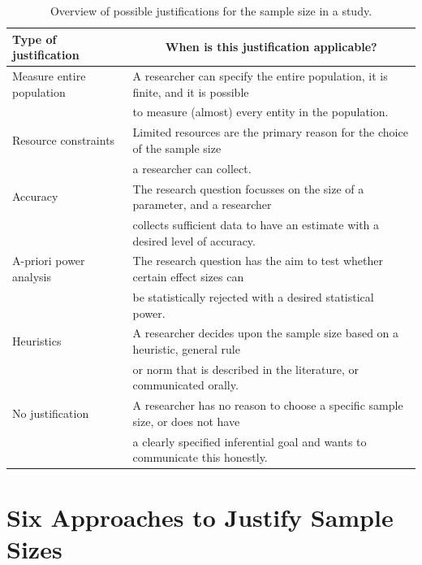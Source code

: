 \documentclass[
  english,
  ,jou, a4paper,floatsintext]{apa6}
\begin{document}
\begin{table}[tbp]

\begin{center}
\begin{threeparttable}

\caption{\label{tab:table-pow-just}Overview of possible justifications for the sample size in a study.}

\begin{tabular}{ll}
\toprule
Type of justification & \multicolumn{1}{c}{When is this justification applicable?}\\
\midrule
Measure entire population & A researcher can specify the entire population, it is finite, and it is possible\\
 & to measure (almost) every entity in the population.\\ \midrule
Resource constraints & Limited resources are the primary reason for the choice of the sample size\\
 & a researcher can collect.\\ \midrule
Accuracy & The research question focusses on the size of a parameter, and a researcher\\
 & collects sufficient data to have an estimate with a desired level of accuracy.\\ \midrule
A-priori power analysis & The research question has the aim to test whether certain effect sizes can\\
 & be statistically rejected with a desired statistical power.\\ \midrule
Heuristics & A researcher decides upon the sample size based on a heuristic, general rule\\
 & or norm that is described in the literature, or communicated orally.\\ \midrule
No justification & A researcher has no reason to choose a specific sample size, or does not have\\
 & a clearly specified inferential goal and wants to communicate this honestly.\\
\bottomrule
\end{tabular}

\end{threeparttable}
\end{center}

\end{table}

\hypertarget{six-approaches-to-justify-sample-sizes}{%
\section{Six Approaches to Justify Sample Sizes}\label{six-approaches-to-justify-sample-sizes}}
\end{document}

